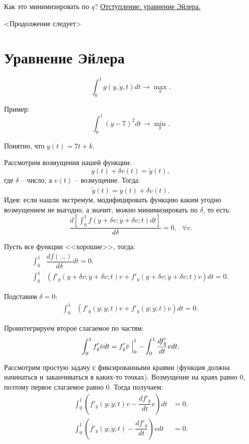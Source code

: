 \documentclass[10pt, a4paper]{extarticle}
\begin{document}
Как это минимизировать по $q$? \hyperlink{euler}{Отступление: уравнение Эйлера.}

<Продолжение следует>

\hypertarget{euler}{}
\section{Уравнение Эйлера}
\[
\int_{0}^{1} g(y, \dot{y}, t)dt \rightarrow \max_y.
\]

Пример:
\[
\int_{0}^{1} (\dot{y} - 7)^2 dt \rightarrow \min_y.
\]

Понятно, что $y(t) = 7t + k$.

Рассмотрим возмущения нашей функции:
\[
y(t) + \delta v(t) = \tilde{y}(t),
\]
где $\delta$ -- число, а $v(t)$ -- возмущение. Тогда:
\[
\dot{\tilde{y}}(t) = \dot{y}(t) + \delta \dot{v}(t).
\]
Идея: если нашли экстремум, модифицировать функцию каким угодно возмущением не выгодно, а значит, можно минимизировать по $\delta$, то есть:
\[
\dfrac{d\left[ \int_{0}^{1} f(y + \delta v; \dot{y} + \delta \dot{v}; t)dt \right]}{d\delta} = 0, \text{ } \forall v.
\]

Пусть все функции <<хорошие>>, тогда:
\begin{align*}
	\int_{0}^{1}& \dfrac{df(\ldots)}{d\delta}dt = 0. \\
	\int_{0}^{1}& \left(f'_y(y + \delta v; \dot{y} + \delta \dot{v}; t)v + f'_{\dot{y}}(y + \delta v; \dot{y} + \delta \dot{v}; t)\dot{v}\right)dt = 0.
\end{align*}

Подставим $\delta = 0$:
\begin{align*}
	\int_{0}^{1}& \left(f'_y(y; \dot{y}; t)v + f'_{\dot{y}}(y; \dot{y};t)\dot{v}\right)dt = 0.
\end{align*}

Проинтегрируем второе слагаемое по частям:
\[
\int_{0}^{1} f'_{\dot{y}}\dot{v}dt = f'_{\dot{y}}\dot{v} \Bigm|^1_0 - \int_{0}^{1} \dfrac{df'_{\dot{y}}}{dt}vdt.
\]

Рассмотрим простую задачу с фиксированными краями (функция должна начинаться и заканчиваться в каких-то точках). Возмущение на краях равно 0, поэтому первое слагаемое равно 0. Тогда получаем:
\begin{align*}
	\int_{0}^{1} \left(f'_y(y; \dot{y}; t)v -  \dfrac{df'_{\dot{y}}}{dt}v\right)dt &= 0. \\
	\int_{0}^{1} \left(f'_y(y; \dot{y}; t) -  \dfrac{df'_{\dot{y}}}{dt}\right)vdt &= 0.
\end{align*}
\end{document}
